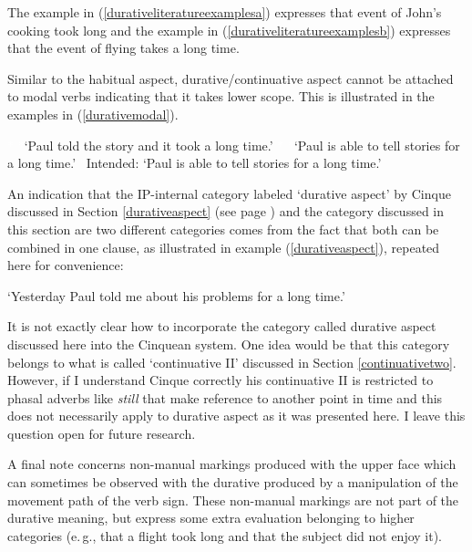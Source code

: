 \noindent The example in (\ref{durativeliteratureexamplesa}) expresses that event of John's cooking took long and the example in (\ref{durativeliteratureexamplesb}) expresses that the event of flying takes a long time.

Similar to the habitual aspect, durative/continuative aspect cannot be attached to modal verbs indicating that it takes lower scope. This is illustrated in the examples in (\ref{durativemodal}). 


\begin{exe}
\ex\label{durativemodal}\begin{xlist}
\ex \textcolor{white}{*}
\glt \textcolor{white}{*}`Paul told the story and it took a long time.'
\ex \textcolor{white}{*}
\glt \textcolor{white}{*}`Paul is able to tell stories for a long time.'
\ex *
\glt \textcolor{white}{*}Intended: `Paul is able to tell stories for a long time.'
\end{xlist}
\end{exe}

\noindent An indication that the IP-internal category labeled `durative aspect' by Cinque discussed in Section \ref{durativeaspect} (see page \pageref{durativeaspect}) and the category discussed in this section are two different categories comes from the fact that both can be combined in one clause, as illustrated in example (\ref{durativeaspect}), repeated here for convenience:


\begin{exe}
\glt `Yesterday Paul told me about his problems for a long time.' \label{ex:durativetwodgstwo}
\end{exe} 

\noindent It is not exactly clear how to incorporate the category called durative aspect discussed here into the Cinquean system. One idea would be that this category belongs to what is called `continuative II' discussed in Section \ref{continuativetwo}. However, if I understand Cinque correctly his continuative II is restricted to phasal adverbs like \textit{still} that make reference to another point in time and this does not necessarily apply to durative aspect as it was presented here. I leave this question open for future research.

A final note concerns non-manual markings produced with the upper face which can sometimes be observed with the durative produced by a manipulation of the movement path of the verb sign. These non-manual markings are not part of the durative meaning, but express some extra evaluation belonging to higher categories (e.\,g., that a flight took long and that the subject did not enjoy it).


